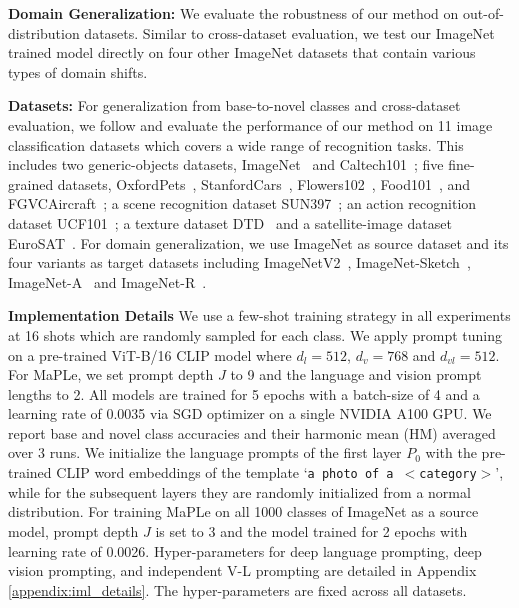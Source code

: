 \documentclass[10pt,twocolumn,letterpaper]{article}
\newcommand{\txt}[1]{{\texttt{#1}}}
\begin{document}
\noindent  \textbf{Domain Generalization:} We evaluate the robustness of our method on out-of-distribution datasets. Similar to cross-dataset evaluation, we test our ImageNet trained model directly on four other ImageNet datasets that contain various types of domain shifts.

\noindent \textbf{Datasets:}
For generalization from base-to-novel classes and cross-dataset evaluation, we follow \cite{zhou2022learning,zhou2022conditional} and evaluate the performance of our method on 11 image classification datasets which covers a wide range of recognition tasks. This includes two generic-objects datasets, ImageNet~\cite{deng2009imagenet} and Caltech101~\cite{fei2004learning}; five fine-grained datasets,  OxfordPets~\cite{parkhi2012cats}, StanfordCars~\cite{krause20133d}, Flowers102~\cite{nilsback2008automated}, Food101~\cite{bossard2014food}, and FGVCAircraft~\cite{maji2013fine}; a scene recognition dataset SUN397~\cite{xiao2010sun}; an action recognition dataset UCF101~\cite{soomro2012ucf101}; a texture dataset  DTD~\cite{cimpoi2014describing} and a satellite-image dataset EuroSAT~\cite{helber2019eurosat}. For domain generalization, we use ImageNet as source dataset and its four variants as target datasets including ImageNetV2~\cite{recht2019imagenet},  ImageNet-Sketch~\cite{wang2019learning}, ImageNet-A~\cite{hendrycks2021natural} and ImageNet-R~\cite{hendrycks2021many}. 

\noindent \textbf{Implementation Details} We use a few-shot training strategy in all experiments at 16 shots which are randomly sampled for each class. We apply prompt tuning on a pre-trained ViT-B/16 CLIP model where $d_{l}=512$, $d_{v}=768$ and $d_{vl}=512$. For MaPLe, we set prompt depth $J$ to 9 and the language and vision prompt lengths to 2. All models are trained for 5 epochs with a batch-size of 4 and a learning rate of 0.0035 via SGD optimizer on a single NVIDIA A100 GPU.
We report base and novel class accuracies and their harmonic mean (HM) averaged over 3 runs. We initialize the language prompts of the first layer $P_{0}$ with the pre-trained CLIP word embeddings of the template `\txt{a photo of a $<$category$>$}', while for the subsequent layers they are randomly initialized from a normal distribution. For training MaPLe on all 1000 classes of ImageNet as a source model, prompt depth $J$ is set to 3 and the model trained for 2 epochs with learning rate of 0.0026. Hyper-parameters for deep language prompting, deep vision prompting, and independent V-L prompting are detailed in Appendix \ref{appendix:iml_details}. The hyper-parameters are fixed across all datasets.
\end{document}
